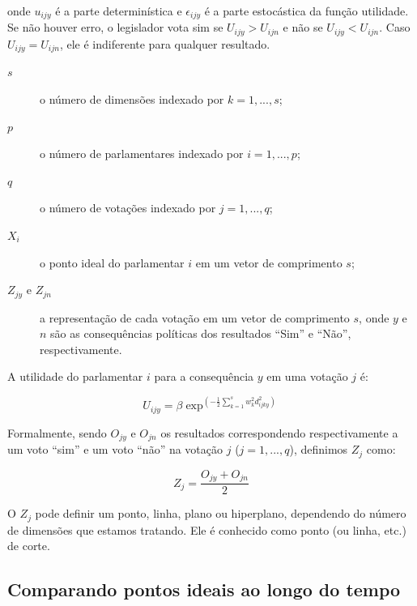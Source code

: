 \documentclass[a4paper,titlepage]{ppgi}\usepackage[]{graphicx}\usepackage[]{color}
\begin{document}
onde $u_{ijy}$ é a parte determinística e $\epsilon_{ijy}$ é a parte
estocástica da função utilidade. Se não houver erro, o legislador vota sim se
$U_{ijy} > U_{ijn}$ e não se $U_{ijy} < U_{ijn}$. Caso $U_{ijy} = U_{ijn}$, ele
é indiferente para qualquer resultado.

\begin{description}
\item[$s$] o número de dimensões indexado por $k = 1, ..., s$;
\item[$p$] o número de parlamentares indexado por $i = 1, ..., p$;
\item[$q$] o número de votações indexado por $j = 1, ..., q$;
\item[$X_i$] o ponto ideal do parlamentar $i$ em um vetor de comprimento $s$;
\item[$Z_{jy}$ e $Z_{jn}$] a representação de cada votação em um vetor de comprimento
$s$, onde $y$ e $n$ são as consequências políticas dos resultados ``Sim'' e
``Não'', respectivamente.
\end{description}

A utilidade do parlamentar $i$ para a consequência $y$ em uma votação $j$ é:

\begin{equation}
  U_{ijy} = \beta \exp^{\left( - \frac{1}{2} \sum\limits_{k=1}^s w_k^2 d_{ijky}^2 \right)}
\end{equation}

Formalmente, sendo $O_{jy}$ e $O_{jn}$ os resultados correspondendo
respectivamente a um voto ``sim'' e um voto ``não'' na votação $j$ ($j = 1,
..., q$), definimos $Z_j$ como: 

\begin{equation}\label{eq:cutpoint}
  Z_j = \frac{O_{jy} + O_{jn}}{2}
\end{equation}

O $Z_j$ pode definir um ponto, linha, plano ou hiperplano, dependendo do número
de dimensões que estamos tratando. Ele é conhecido como ponto (ou linha, etc.)
de corte.







\subsection{Comparando pontos ideais ao longo do tempo}
\label{cap:fundamentacao:comparando-pontos-ideais-no-tempo}
\end{document}
